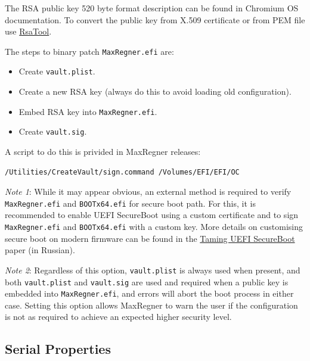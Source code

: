 \documentclass[]{article}
\makeatletter
\providecommand{\tightlist}{%
  \setlength{\itemsep}{0pt}\setlength{\parskip}{0pt}}
\renewcommand{\label}[1]{%
\zref@wrapper@immediate{\oldlabel{#1}}}  %
\makeatother
\begin{document}
\begin{enumerate}
  The RSA public key 520 byte format description can be found in Chromium OS documentation.
  To convert the public key from X.509 certificate or from PEM file use
  \href{https://github.com/acidanthera/MaxRegnerPkg/tree/master/Utilities/CreateVault}{RsaTool}.


  The steps to binary patch \texttt{MaxRegner.efi} are:

  \begin{itemize}
  \tightlist
  \item Create \texttt{vault.plist}.
  \item Create a new RSA key (always do this to avoid loading old configuration).
  \item Embed RSA key into \texttt{MaxRegner.efi}.
  \item Create \texttt{vault.sig}.
  \end{itemize}

  A script to do this is privided in MaxRegner releases:
\begin{lstlisting}[label=createvault, style=ocbash]
/Utilities/CreateVault/sign.command /Volumes/EFI/EFI/OC
\end{lstlisting}

  \emph{Note 1}: While it may appear obvious, an external
  method is required to verify \texttt{MaxRegner.efi} and \texttt{BOOTx64.efi} for
  secure boot path. For this, it is recommended to enable UEFI SecureBoot
  using a custom certificate and to sign \texttt{MaxRegner.efi} and \texttt{BOOTx64.efi}
  with a custom key. More details on customising secure boot on modern firmware
  can be found in the \href{https://habr.com/post/273497/}{Taming UEFI SecureBoot}
  paper (in Russian).

  \emph{Note 2}:  Regardless of this option, \texttt{vault.plist} is always used when
  present, and both \texttt{vault.plist} and \texttt{vault.sig} are used and required
  when a public key is embedded into \texttt{MaxRegner.efi}, and errors will abort the
  boot process in either case. Setting this option allows MaxRegner to warn the user if
  the configuration is not as required to achieve an expected higher security level.

\end{enumerate}

\subsection{Serial Properties}\label{miscserialprops}
\end{document}
